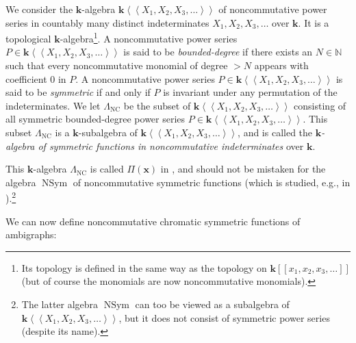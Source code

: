 \documentclass[numbers=enddot,12pt,final,onecolumn,notitlepage]{scrartcl}%
\theoremstyle{definition}
\begin{document}
We consider the $\mathbf{k}$-algebra $\mathbf{k}\left\langle \left\langle
X_{1},X_{2},X_{3},\ldots\right\rangle \right\rangle $ of noncommutative power
series in countably many distinct indeterminates $X_{1},X_{2},X_{3},\ldots$
over $\mathbf{k}$. It is a topological $\mathbf{k}$-algebra\footnote{Its
topology is defined in the same way as the topology on $\mathbf{k}\left[
\left[  x_{1},x_{2},x_{3},\ldots\right]  \right]  $ (but of course the
monomials are now noncommutative monomials).}. A noncommutative power series
$P\in\mathbf{k}\left\langle \left\langle X_{1},X_{2},X_{3},\ldots\right\rangle
\right\rangle $ is said to be \emph{bounded-degree} if there exists an
$N\in\mathbb{N}$ such that every noncommutative monomial of degree $>N$
appears with coefficient $0$ in $P$. A noncommutative power series
$P\in\mathbf{k}\left\langle \left\langle X_{1},X_{2},X_{3},\ldots\right\rangle
\right\rangle $ is said to be \emph{symmetric} if and only if $P$ is invariant
under any permutation of the indeterminates. We let $\Lambda
_{\operatorname*{NC}}$ be the subset of $\mathbf{k}\left\langle \left\langle
X_{1},X_{2},X_{3},\ldots\right\rangle \right\rangle $ consisting of all
symmetric bounded-degree power series $P\in\mathbf{k}\left\langle \left\langle
X_{1},X_{2},X_{3},\ldots\right\rangle \right\rangle $. This subset
$\Lambda_{\operatorname*{NC}}$ is a $\mathbf{k}$-subalgebra of $\mathbf{k}%
\left\langle \left\langle X_{1},X_{2},X_{3},\ldots\right\rangle \right\rangle
$, and is called the $\mathbf{k}$\emph{-algebra of symmetric functions in
noncommutative indeterminates} over $\mathbf{k}$.

This $\mathbf{k}$-algebra $\Lambda_{\operatorname*{NC}}$ is called $\Pi\left(
\mathbf{x}\right)  $ in \cite{RosSag04}, and should not be mistaken for the
algebra $\operatorname*{NSym}$ of noncommutative symmetric functions (which is
studied, e.g., in \cite[\S 5.4]{Reiner}).\footnote{The latter algebra
$\operatorname*{NSym}$ can too be viewed as a subalgebra of $\mathbf{k}%
\left\langle \left\langle X_{1},X_{2},X_{3},\ldots\right\rangle \right\rangle
$, but it does not consist of symmetric power series (despite its name).}

We can now define noncommutative chromatic symmetric functions of ambigraphs:
\end{document}
